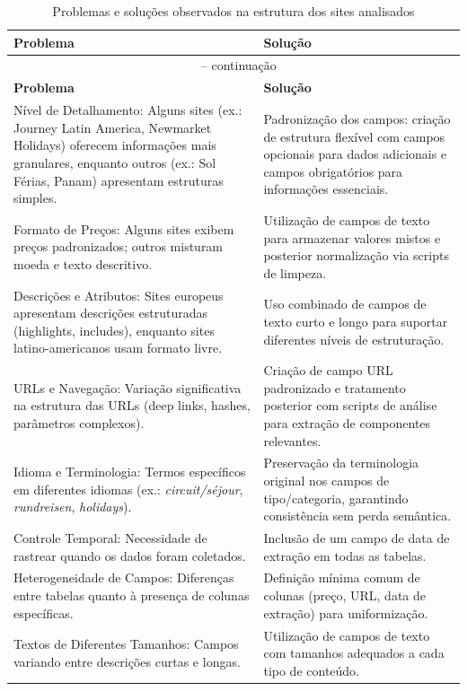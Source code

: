 
\begin{longtable}{|p{7cm}|p{7cm}|}
\caption{Problemas e soluções observados na estrutura dos sites analisados}
\label{tab:problemas_solucoes} \\
\hline
\textbf{Problema} & \textbf{Solução} \\ \hline
\endfirsthead

\multicolumn{2}{c}{\tablename\ \thetable{} -- continuação} \\
\hline
\textbf{Problema} & \textbf{Solução} \\ \hline
\endhead

\hline
\endfoot

Nível de Detalhamento: Alguns sites (ex.: Journey Latin America, Newmarket Holidays) oferecem informações mais granulares, enquanto outros (ex.: Sol Férias, Panam) apresentam estruturas simples.
&
Padronização dos campos: criação de estrutura flexível com campos opcionais para dados adicionais e campos obrigatórios para informações essenciais. \\ \hline

Formato de Preços: Alguns sites exibem preços padronizados; outros misturam moeda e texto descritivo.
&
Utilização de campos de texto para armazenar valores mistos e posterior normalização via scripts de limpeza. \\ \hline

Descrições e Atributos: Sites europeus apresentam descrições estruturadas (highlights, includes), enquanto sites latino-americanos usam formato livre.
&
Uso combinado de campos de texto curto e longo para suportar diferentes níveis de estruturação. \\ \hline

URLs e Navegação: Variação significativa na estrutura das URLs (deep links, hashes, parâmetros complexos).
&
Criação de campo URL padronizado e tratamento posterior com scripts de análise para extração de componentes relevantes. \\ \hline

Idioma e Terminologia: Termos específicos em diferentes idiomas (ex.: \textit{circuit/séjour}, \textit{rundreisen}, \textit{holidays}).
&
Preservação da terminologia original nos campos de tipo/categoria, garantindo consistência sem perda semântica. \\ \hline

Controle Temporal: Necessidade de rastrear quando os dados foram coletados.
&
Inclusão de um campo de data de extração em todas as tabelas. \\ \hline

Heterogeneidade de Campos: Diferenças entre tabelas quanto à presença de colunas específicas.
&
Definição mínima comum de colunas (preço, URL, data de extração) para uniformização. \\ \hline

Textos de Diferentes Tamanhos: Campos variando entre descrições curtas e longas.
&
Utilização de campos de texto com tamanhos adequados a cada tipo de conteúdo. \\ \hline

\end{longtable}

